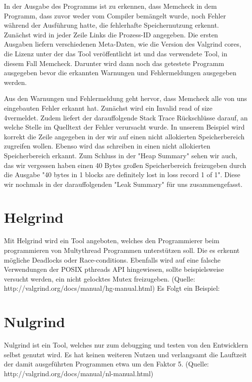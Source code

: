 In der Ausgabe des Programms ist zu erkennen, dass Memcheck in dem Programm, dass zuvor weder vom Compiler bemängelt wurde, noch Fehler während der Ausführung hatte, die fehlerhafte Speichernutzung erkennt.
Zunächst wird in jeder Zeile Links die Prozess-ID angegeben. Die ersten Ausgaben liefern verschiedenen Meta-Daten, wie die Version des Valgrind cores, die Lizenz unter der das Tool veröffentlicht ist und das verwendete Tool, in diesem Fall Memcheck. Darunter wird dann noch das getestete Programm ausgegeben bevor die erkannten Warnungen und Fehlermeldungen ausgegeben werden. 

Aus den Warnungen und Fehlermeldung geht hervor, dass Memcheck alle von uns eingebauten Fehler erkannt hat. Zunächst wird ein \glqq Invalid read of size 4\grqq  vermeldet. Zudem liefert der darauffolgende Stack Trace Rückschlüsse darauf, an welche Stelle im Quelltext der Fehler verursacht wurde. In unserem Beispiel wird korrekt die Zeile angegeben in der wir auf einen nicht allokierten Speicherbereich zugreifen wollen. Ebenso wird das schreiben in einen nicht allokierten Speicherbereich erkannt. Zum Schluss in der "Heap Summary" sehen wir auch, das wir vergessen haben einen 40 Bytes großen Speicherbereich freizugeben durch die Ausgabe "40 bytes in 1 blocks are definitely lost in loss record 1 of 1". Diese wir nochmals in der darauffolgenden "Leak Summary" für uns zusammengefasst.

\section{Helgrind}
Mit Helgrind wird ein Tool angeboten, welches den Programmierer beim programmieren von Multythread Programmen unterstützen soll. Die es erkennt mögliche Deadlocks oder Race-conditions. Ebenfalls wird auf eine falsche Verwendungen der POSIX pthreads API hingewiesen, sollte beispielsweise versucht werden, ein nicht gelocktes Mutex freizugeben.
(Quelle: http://valgrind.org/docs/manual/hg-manual.html)
Es Folgt ein Beispiel:

\section{Nulgrind}
Nulgrind ist ein Tool, welches nur zum debugging und testen von den Entwicklern selbst genutzt wird. Es hat keinen weiteren Nutzen und verlangsamt die Lauftzeit der damit ausgeführten Programmen etwa um den Faktor 5. (Quelle: http://valgrind.org/docs/manual/nl-manual.html)